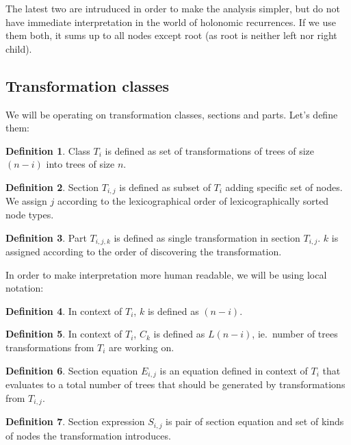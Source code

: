 \documentclass[final]{article}
\theoremstyle{definition}
\newtheorem{definition}{Definition}[subsection]
\theoremstyle{remark}
\begin{document}
The latest two are intruduced in order to make the analysis simpler, but do not have immediate interpretation in the world of holonomic recurrences. If we use them both, it sums up to all nodes except root (as root is neither left nor right child).


\subsection{Transformation classes}%
\label{sub:transformation_classes}

We will be operating on transformation classes, sections and parts. Let's define them:

\begin{definition}
    Class \(T_i\) is defined as set of transformations of trees of size \((n - i)\) into trees of size \(n\).
\end{definition}

\begin{definition}
    Section \(T_{i,j}\) is defined as subset of \(T_i\) adding specific set of nodes. We assign \(j\) according to the lexicographical order of lexicographically sorted node types.
\end{definition}

\begin{definition}
    Part \(T_{i,j,k}\) is defined as single transformation in section \(T_{i,j}\). \(k\) is assigned according to the order of discovering the transformation.
\end{definition}

In order to make interpretation more human readable, we will be using local notation:

\begin{definition}
    In context of \(T_i\), \(k\) is defined as \((n - i)\).
\end{definition}

\begin{definition}
    In context of \(T_i\), \(C_k\) is defined as \(L(n - i)\), ie.\ number of trees transformations from \(T_i\) are working on.
\end{definition}

\begin{definition}
    Section equation \(E_{i, j}\) is an equation defined in context of \(T_i\) that evaluates to a total number of trees that should be generated by transformations from \(T_{i, j}\).
\end{definition}

\begin{definition}
    Section expression \(S_{i, j}\) is pair of section equation and set of kinds of nodes the transformation introduces.
\end{definition}
\end{document}
